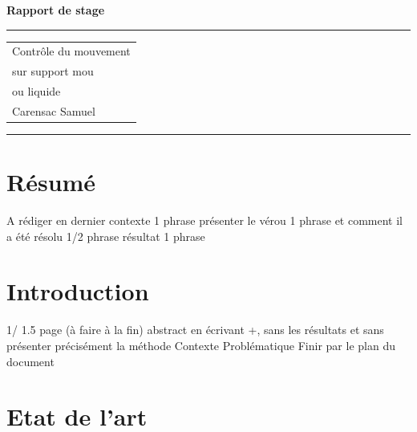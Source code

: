 \documentclass{llncs}
\begin{document}
\thispagestyle{empty}
\begin{flushleft}
\LARGE\bfseries Rapport de stage\\[2cm]
\end{flushleft}
\rule{\textwidth}{1pt}
\vspace{2pt}
\begin{flushright}
\Huge
\begin{tabular}{@{}l}
Contrôle du mouvement\\
sur support mou\\
ou liquide\\[6pt]
{\Large Carensac Samuel}
\end{tabular}
\end{flushright}
\rule{\textwidth}{1pt}
\vfill
%
\newpage
\tableofcontents
\newpage
%
\section{Résumé}
%
A rédiger en dernier
contexte 1 phrase
présenter le vérou 1 phrase
et comment il a été résolu 1/2 phrase
résultat 1 phrase
%
\section{Introduction}
%
1/ 1.5 page (à faire à la fin) abstract en écrivant +, sans les résultats et sans présenter précisément la méthode
Contexte
Problématique
Finir par le plan du document


%
\section{Etat de l'art}
%
\end{document}
